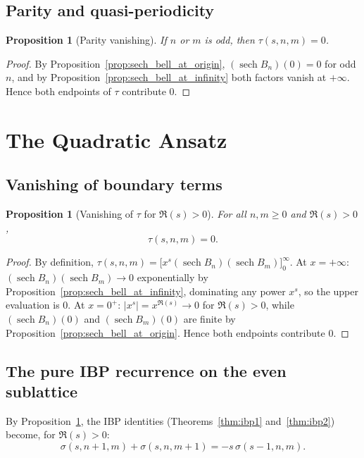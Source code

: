 \documentclass[article]{article}
\theoremstyle{plain}
\newtheorem{proposition}[theorem]{Proposition}
\theoremstyle{definition}
\DeclareMathOperator{\sech}{sech}
\begin{document}
\subsection{Parity and quasi-periodicity}

\begin{proposition}[Parity vanishing]\label{prop:parity_tau}
If $n$ or $m$ is odd, then $\tau(s,n,m)=0$.
\end{proposition}

\begin{proof}
By Proposition~\ref{prop:sech_bell_at_origin}, $(\sech B_{n})(0)=0$ for odd $n$,
and by Proposition~\ref{prop:sech_bell_at_infinity} both factors vanish at $+\infty$.
Hence both endpoints of $\tau$ contribute $0$.
\end{proof}

\section{The Quadratic Ansatz}\label{sec:ansatz}

\subsection{Vanishing of boundary terms}

\begin{proposition}[Vanishing of $\tau$ for $\Re(s)>0$]\label{prop:tau_zero}
For all $n,m\ge 0$ and $\Re(s)>0$,
\[
  \tau(s,n,m)=0.
\]
\end{proposition}

\begin{proof}
By definition, $\tau(s,n,m)=\bigl[x^{s}(\sech B_{n})(\sech B_{m})\bigr]_{0}^{\infty}$.
At $x=+\infty$: $(\sech B_{n})(\sech B_{m})\to 0$ exponentially by
Proposition~\ref{prop:sech_bell_at_infinity}, dominating any power $x^{s}$, so the
upper evaluation is $0$.
At $x=0^{+}$: $|x^{s}|=x^{\Re(s)}\to 0$ for $\Re(s)>0$, while
$(\sech B_{n})(0)$ and $(\sech B_{m})(0)$ are finite by
Proposition~\ref{prop:sech_bell_at_origin}.
Hence both endpoints contribute $0$.
\end{proof}

\subsection{The pure IBP recurrence on the even sublattice}

By Proposition~\ref{prop:tau_zero}, the IBP identities
(Theorems~\ref{thm:ibp1} and~\ref{thm:ibp2}) become, for $\Re(s)>0$:
\begin{equation*}
  \sigma(s,n+1,m)+\sigma(s,n,m+1)=-s\,\sigma(s-1,n,m). \tag*{(*)}
\end{equation*}
\end{document}
